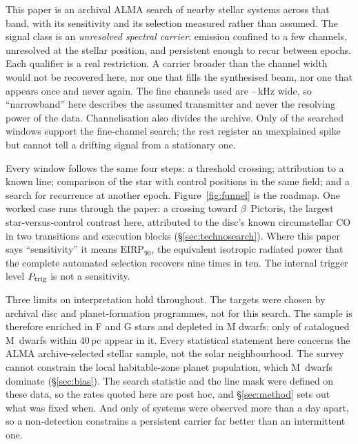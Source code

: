 This paper is an archival ALMA search of nearby stellar systems across
that band, with its sensitivity and its selection measured rather than
assumed. The signal class is an \emph{unresolved spectral carrier}:
emission confined to a few channels, unresolved at the stellar position,
and persistent enough to recur between epochs. Each qualifier is a real
restriction. A carrier broader than the channel width would not be
recovered here, nor one that fills the synthesised beam, nor one that
appears once and never again. The fine channels used are
\ChanLoA--\ChanHiA\,kHz wide, so ``narrowband'' here describes the
assumed transmitter and never the resolving power of the data.
Channelisation also divides the archive. Only \NWinA{} of the
\NWindows{} searched windows support the fine-channel search; the rest
register an unexplained spike but cannot tell a drifting signal from a
stationary one.

Every window follows the same four steps: a threshold crossing;
attribution to a known line; comparison of the star with \NCtrl{}
control positions in the same field; and a search for recurrence at
another epoch. Figure~\ref{fig:funnel} is the roadmap. One
worked case runs through the paper: a crossing toward $\beta$~Pictoris,
the largest star-versus-control contrast here, attributed to the disc's
known circumstellar CO in two transitions and \NStageOneBpicEb{}
execution blocks (\S\ref{sec:technosearch}). Where this paper says
``sensitivity'' it means $\mathrm{EIRP}_{90}$, the equivalent isotropic
radiated power that the complete automated selection recovers nine times
in ten. The internal trigger level $P_{\rm trig}$ is not a sensitivity.

Three limits on interpretation hold throughout. The targets were chosen
by archival disc and planet-formation programmes, not for this search.
The sample is therefore enriched in F and G stars and depleted in M
dwarfs: only \NMSearched{} of \NMCensus{} catalogued M~dwarfs within
40\,pc appear in it. Every statistical statement here concerns the ALMA
archive-selected stellar sample, not the solar neighbourhood. The survey
cannot constrain the local habitable-zone planet population, which
M~dwarfs dominate (\S\ref{sec:bias}). The search statistic and the
line mask were defined on these data, so the rates quoted here are post
hoc, and \S\ref{sec:method} sets out what was fixed when. And only
\EpIndep{} of \EpTot{} systems were observed more than a day apart, so a
non-detection constrains a persistent carrier far better than an
intermittent one.

